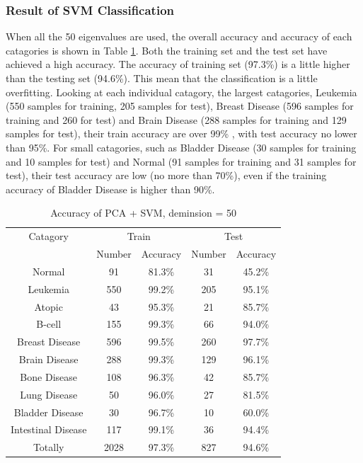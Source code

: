 \documentclass[sigchi]{acmart}
\begin{document}
\subsubsection{Result of SVM Classification}

When all the 50 eigenvalues are used, the overall accuracy and accuracy of each catagories is shown in Table \ref{tab:AccuracySVM50}. Both the training set and the test set have achieved a high accuracy. The accuracy of training set (97.3\%) is a little higher than the testing set (94.6\%). This mean that the classification is a little overfitting. Looking at each individual catagory, the largest catagories, Leukemia (550 samples for training, 205 samples for test), Breast Disease (596 samples for training and 260 for test) and Brain Disease (288 samples for training and 129 samples for test), their train accuracy are over 99\% , with test accuracy no lower than 95\%. For small catagories, such as Bladder Disease (30 samples for training and 10 samples for test) and Normal (91 samples for training and 31 samples for test), their test accuracy are low (no more than 70\%), even if the training accuracy of Bladder Disease is higher than 90\%.

\begin{table}
  \caption{Accuracy of PCA + SVM, deminsion = 50}
  \label{tab:AccuracySVM50}
  \begin{tabular}{ccccc}
    \toprule
    Catagory & \multicolumn{2}{c}{Train} & \multicolumn{2}{c}{Test}\\
    & Number & Accuracy & Number & Accuracy\\
    \midrule
    Normal & 91 & 81.3\% & 31 & 45.2\% \\
    Leukemia & 550 & 99.2\% & 205 & 95.1\% \\
    Atopic & 43 & 95.3\% & 21 & 85.7\% \\
    B-cell & 155 & 99.3\% & 66 & 94.0\% \\
    Breast Disease &  596 & 99.5\% & 260 & 97.7\% \\
    Brain Disease & 288 & 99.3\% & 129 & 96.1\% \\
    Bone Disease & 108 & 96.3\% & 42 & 85.7\% \\
    Lung Disease & 50 & 96.0\% & 27 & 81.5\% \\
    Bladder Disease & 30 & 96.7\% & 10 & 60.0\% \\
    Intestinal Disease & 117 & 99.1\% & 36 & 94.4\% \\
    \midrule
    Totally & 2028 & 97.3\% & 827 & 94.6\% \\
    \bottomrule
  \end{tabular}
\end{table}
\end{document}
